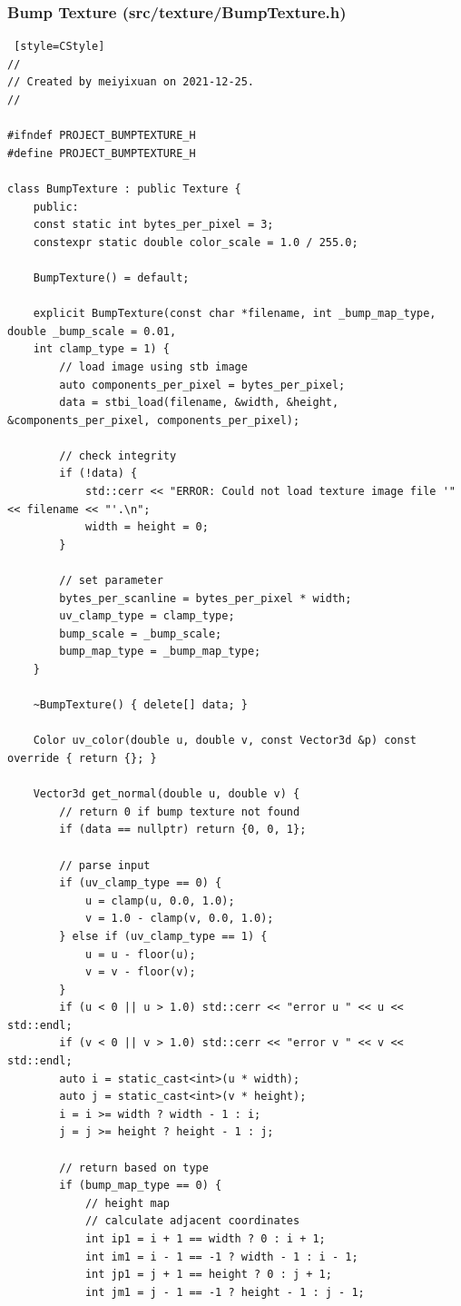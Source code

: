 \documentclass[utf8]{article}
\begin{document}
\subsubsection{Bump Texture (src/texture/BumpTexture.h)}
\begin{lstlisting} [style=CStyle]
//
// Created by meiyixuan on 2021-12-25.
//

#ifndef PROJECT_BUMPTEXTURE_H
#define PROJECT_BUMPTEXTURE_H

class BumpTexture : public Texture {
	public:
	const static int bytes_per_pixel = 3;
	constexpr static double color_scale = 1.0 / 255.0;
	
	BumpTexture() = default;
	
	explicit BumpTexture(const char *filename, int _bump_map_type, double _bump_scale = 0.01,
	int clamp_type = 1) {
		// load image using stb image
		auto components_per_pixel = bytes_per_pixel;
		data = stbi_load(filename, &width, &height, &components_per_pixel, components_per_pixel);
		
		// check integrity
		if (!data) {
			std::cerr << "ERROR: Could not load texture image file '" << filename << "'.\n";
			width = height = 0;
		}
		
		// set parameter
		bytes_per_scanline = bytes_per_pixel * width;
		uv_clamp_type = clamp_type;
		bump_scale = _bump_scale;
		bump_map_type = _bump_map_type;
	}
	
	~BumpTexture() { delete[] data; }
	
	Color uv_color(double u, double v, const Vector3d &p) const override { return {}; }
	
	Vector3d get_normal(double u, double v) {
		// return 0 if bump texture not found
		if (data == nullptr) return {0, 0, 1};
		
		// parse input
		if (uv_clamp_type == 0) {
			u = clamp(u, 0.0, 1.0);
			v = 1.0 - clamp(v, 0.0, 1.0);
		} else if (uv_clamp_type == 1) {
			u = u - floor(u);
			v = v - floor(v);
		}
		if (u < 0 || u > 1.0) std::cerr << "error u " << u << std::endl;
		if (v < 0 || v > 1.0) std::cerr << "error v " << v << std::endl;
		auto i = static_cast<int>(u * width);
		auto j = static_cast<int>(v * height);
		i = i >= width ? width - 1 : i;
		j = j >= height ? height - 1 : j;
		
		// return based on type
		if (bump_map_type == 0) {
			// height map
			// calculate adjacent coordinates
			int ip1 = i + 1 == width ? 0 : i + 1;
			int im1 = i - 1 == -1 ? width - 1 : i - 1;
			int jp1 = j + 1 == height ? 0 : j + 1;
			int jm1 = j - 1 == -1 ? height - 1 : j - 1;
			

\end{lstlisting}
\end{document}
